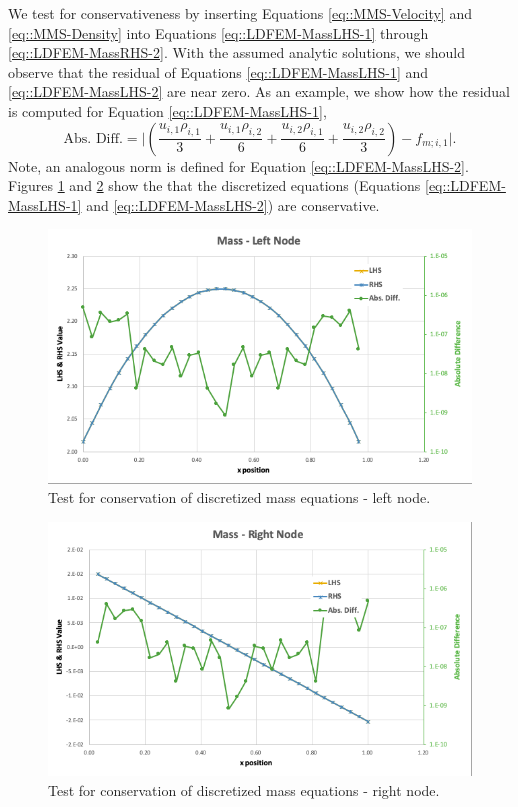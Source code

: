 \documentclass{article}
\begin{document}
We test for conservativeness by inserting Equations \ref{eq::MMS-Velocity} and \ref{eq::MMS-Density} into Equations \ref{eq::LDFEM-MassLHS-1} through \ref{eq::LDFEM-MassRHS-2}. With the assumed analytic solutions, we should observe that the residual of Equations \ref{eq::LDFEM-MassLHS-1} and \ref{eq::LDFEM-MassLHS-2} are near zero. As an example, we show how the residual is computed for Equation \ref{eq::LDFEM-MassLHS-1},
\begin{equation}
    \label{eq::Residual}
    \text{Abs. Diff.} = \lvert \left( \frac{u_{i,1}\rho_{i,1}}{3} + \frac{u_{i,1}\rho_{i,2}}{6} + \frac{u_{i,2}\rho_{i,1}}{6} + \frac{u_{i,2}\rho_{i,2}}{3} \right) - f_{m;i,1} \rvert.
\end{equation}
Note, an analogous norm is defined for Equation \ref{eq::LDFEM-MassLHS-2}. Figures \ref{fig::Mass-1} and \ref{fig::Mass-2} show the that the discretized equations (Equations \ref{eq::LDFEM-MassLHS-1} and \ref{eq::LDFEM-MassLHS-2}) are conservative.
\begin{figure}[h!]
\centering
\includegraphics[scale=0.4]{./figures/Mass_1}
\caption{Test for conservation of discretized mass equations - left node.}
\label{fig::Mass-1}
\end{figure}
\begin{figure}[h!]
\centering
\includegraphics[scale=0.4]{./figures/Mass_2}
\caption{Test for conservation of discretized mass equations - right node.}
\label{fig::Mass-2}
\end{figure}
\end{document}
